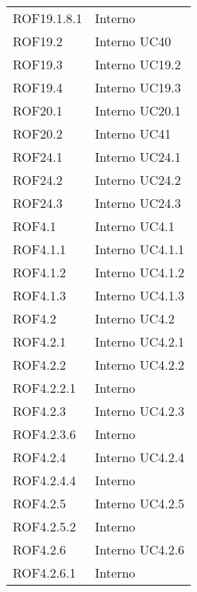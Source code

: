\begin{longtable}{p{2.5cm}!{\VRule[1pt]}p{2.5cm}}
	ROF19.1.8.1 & Interno \\
	ROF19.2 & Interno \newline UC40
	\\
	ROF19.3 & Interno \newline UC19.2
	\\
	ROF19.4 & Interno \newline UC19.3
	\\
	ROF20.1 & Interno \newline UC20.1
	\\
	ROF20.2 & Interno \newline UC41
	\\
	ROF24.1 & Interno \newline UC24.1
	\\
	ROF24.2 & Interno \newline UC24.2
	\\
	ROF24.3 & Interno \newline UC24.3
	\\
	ROF4.1 & Interno \newline UC4.1
	\\
	ROF4.1.1 & Interno \newline UC4.1.1
	\\
	ROF4.1.2 & Interno \newline UC4.1.2
	\\
	ROF4.1.3 & Interno \newline UC4.1.3
	\\
	ROF4.2 & Interno \newline UC4.2
	\\
	ROF4.2.1 & Interno \newline UC4.2.1
	\\
	ROF4.2.2 & Interno \newline UC4.2.2
	\\
	ROF4.2.2.1 & Interno \\
	ROF4.2.3 & Interno \newline UC4.2.3
	\\
	ROF4.2.3.6 & Interno \\
	ROF4.2.4 & Interno \newline UC4.2.4
	\\
	ROF4.2.4.4 & Interno \\
	ROF4.2.5 & Interno \newline UC4.2.5
	\\
	ROF4.2.5.2 & Interno \\
	ROF4.2.6 & Interno \newline UC4.2.6
	\\
	ROF4.2.6.1 & Interno \\

\end{longtable}
